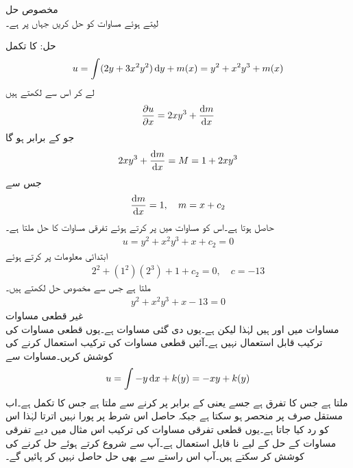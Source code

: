 \quad مخصوص حل\\
 لیتے ہوئے مساوات  کو حل کریں  جہاں  پر  ہے۔

حل: کا  تکمل
\begin{align}\label{مساوات_سادہ_اول_قطعی_دوسرا_متغیر}
u=\int (2y+3x^2y^2)\dif y+m(x)=y^2+x^2y^3+m(x)
\end{align} 
لے کر اس سے  لکھتے ہیں
\begin{align*}
\frac{\partial u}{\partial x}=2xy^3+\frac{\dif m}{\dif x}
\end{align*}
جو  کے برابر ہو گا
\begin{align*}
2xy^3+\frac{\dif m}{\dif x}=M=1+2xy^3
\end{align*}
جس سے
\begin{align*}
\frac{\dif m}{\dif x}=1, \quad m=x+c_2
\end{align*}
حاصل ہوتا ہے۔اس کو مساوات  میں پر کرتے ہوئے تفرقی مساوات کا حل ملتا ہے۔
\begin{align*}
u=y^2+x^2y^3+x+c_2=0
\end{align*}
ابتدائی معلومات پر کرتے ہوئے
\begin{align*}
2^2+(1^2) (2^3)+1+c_2=0, \quad c=-13
\end{align*}
ملتا ہے جس سے مخصوص حل لکھتے ہیں۔
\begin{align*}
y^2+x^2y^3+x-13=0
\end{align*}
\quad غیر قطعی مساوات\\
مساوات  میں  اور  ہیں لہٰذا  لیکن  ہے۔یوں دی گئی مساوات  ہے۔یوں قطعی مساوات کی ترکیب قابل استعمال نہیں ہے۔آئیں قطعی مساوات کی ترکیب استعمال کرنے کی کوشش کریں۔مساوات  سے
\begin{align*}
u=\int -y \dif x+k(y)=-xy+k(y)
\end{align*}
ملتا ہے جس کا  تفرق  ہے جسے  یعنی  کے برابر پر کرنے سے 
 ملتا ہے جس کا تکمل  ہے۔اب مستقل  صرف  پر منحصر ہو سکتا ہے جبکہ حاصل  اس شرط پر پورا نہیں اترتا لہٰذا اس کو رد کیا جاتا ہے۔یوں قطعی تفرقی مساوات کی ترکیب اس مثال میں دیے تفرقی مساوات کے حل کے لیے نا قابل استعمال ہے۔آپ  سے شروع کرتے ہوئے حل کرنے کی کوشش کر سکتے ہیں۔آپ اس راستے سے بھی حل حاصل نہیں کر پائیں گے۔

